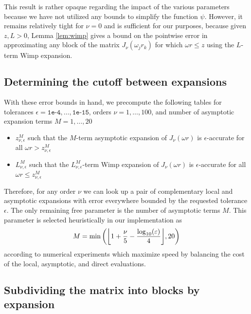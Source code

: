 This result is rather opaque regarding the impact of the various parameters
because we have not utilized any bounds to simplify the function $\psi$.
However, it remains relatively tight for $\nu = 0$ and is sufficient for our
purposes, because given $z, L > 0$, Lemma \ref{lem:wimp} gives a bound on the
pointwise error in approximating any block of the matrix $J_\nu(\omega_j r_k)$
for which $\omega r \leq z$ using the $L$-term Wimp expansion.

\subsection{Determining the cutoff between expansions}

With these error bounds in hand, we precompute the following tables for
tolerances $\epsilon = \texttt{1e-4}, \dots, \texttt{1e-15}$, orders $\nu = 1,
\dots, 100$, and number of asymptotic expansion terms $M = 1, \dots, 20$
\begin{itemize}
    \item $z_{\nu, \epsilon}^M$ such that the $M$-term asymptotic expansion of
    $J_\nu(\omega r)$ is $\epsilon$-accurate for all $\omega r > z_{\nu,
    \epsilon}^M$
    \item $L_{\nu, \epsilon}^M$ such that the $L_{\nu, \epsilon}^M$-term Wimp
    expansion of $J_\nu(\omega r)$ is $\epsilon$-accurate for all $\omega r \leq
    z_{\nu, \epsilon}^M$
\end{itemize}
Therefore, for any order $\nu$ we can look up a pair of complementary local and
asymptotic expansions with error everywhere bounded by the requested tolerance
$\epsilon$. The only remaining free parameter is the number of asymptotic terms
$M$. This parameter is selected heuristically in our implementation as 
\begin{equation}
    M = \min\left({\left\lfloor 1 + \frac{\nu}{5} - \frac{\log_{10}(\varepsilon)}{4} \right\rfloor}, 20\right)
\end{equation}
according to numerical experiments which maximize speed by balancing the cost of
the local, asymptotic, and direct evaluations.

\subsection{Subdividing the matrix into blocks by expansion}

